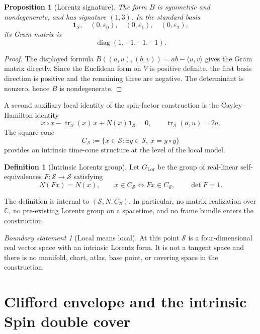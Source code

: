 \documentclass[11pt,a4paper]{article}
\newtheorem{proposition}[theorem]{Proposition}
\theoremstyle{definition}
\newtheorem{definition}[theorem]{Definition}
\theoremstyle{remark}
\newtheorem{boundary}[theorem]{Boundary statement}
\newcommand{\Smodel}{\mathcal{S}}
\newcommand{\LorG}{G_{\mathrm{Lor}}}
\begin{document}
\begin{proposition}[Lorentz signature]
\label{prop:signature}
The form \(B\) is symmetric and nondegenerate, and has signature \((1,3)\).
In the standard basis
\[
   \mathbf{1}_{\Smodel},\quad
   (0,\varepsilon_{0}),\quad(0,\varepsilon_{1}),\quad(0,\varepsilon_{2}),
\]
its Gram matrix is
\[
   \operatorname{diag}(1,-1,-1,-1).
\]
\end{proposition}

\begin{proof}
The displayed formula
\(B((a,u),(b,v))=ab-\langle u,v\rangle\)
gives the Gram matrix directly.  Since the Euclidean form on \(V\) is
positive definite, the first basis direction is positive and the remaining
three are negative.  The determinant is nonzero, hence \(B\) is
nondegenerate.
\end{proof}

A second auxiliary local identity of the spin-factor construction is the
Cayley--Hamilton identity
\[
   x\circ x-\operatorname{tr}_{\Smodel}(x)\,x
   +N(x)\mathbf{1}_{\Smodel}=0,
   \qquad
   \operatorname{tr}_{\Smodel}(a,u)=2a.
\tag{2.1}
\]
The square cone
\[
   C_{\Smodel}:=
   \{x\in\Smodel:\exists y\in\Smodel,\ x=y\circ y\}
\tag{2.2}
\]
provides an intrinsic time-cone structure at the level of the local model.

\begin{definition}[Intrinsic Lorentz group]
\label{def:GLor}
Let \(\LorG\) be the group of real-linear self-equivalences
\(F:\Smodel\to\Smodel\) satisfying
\[
   N(Fx)=N(x),\qquad
   x\in C_{\Smodel}\Longleftrightarrow Fx\in C_{\Smodel},
   \qquad
   \det F=1.
\tag{2.3}
\]
\end{definition}

The definition is internal to \((\Smodel,N,C_{\Smodel})\).  In particular,
no matrix realization over \(\mathbb C\), no pre-existing Lorentz group on
a spacetime, and no frame bundle enters the construction.

\begin{boundary}[Local means local]
\label{bdry:no-manifold-yet}
At this point \(\Smodel\) is a four-dimensional real vector space with an
intrinsic Lorentz form.  It is not a tangent space and there is no manifold,
chart, atlas, base point, or covering space in the construction.
\end{boundary}

\clearpage
\section{Clifford envelope and the intrinsic Spin double cover}
\label{sec:clifford}
\end{document}
